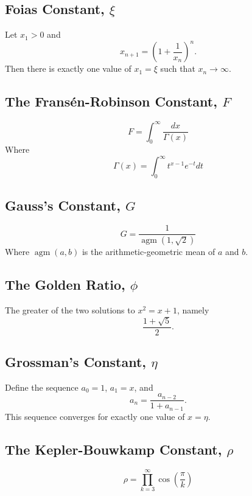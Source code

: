 \documentclass[12pt]{article}
\begin{document}
\subsection{Foias Constant, $\xi$}
Let $x_{1} > 0$ and
\begin{equation*}
x_{n+1} = \left(1 + \frac{1}{x_{n}}\right)^{n}.
\end{equation*}
Then there is exactly one value of $x_{1} = \xi$ such that $x_{n} \rightarrow \infty$.

\subsection{The Frans\'en-Robinson Constant, $F$}
\begin{equation*}
F = \int_{0}^{\infty} \frac{dx}{\Gamma(x)}
\end{equation*}
Where
\begin{equation*}
\Gamma(x) = \int_{0}^{\infty} t^{x - 1}e^{-t} dt 
\end{equation*}

\subsection{Gauss's Constant, $G$}
\begin{equation*}
G = \frac{1}{\operatorname{agm}(1,\sqrt{2})}
\end{equation*}
Where $\operatorname{agm}(a,b)$ is the arithmetic-geometric mean of $a$ and $b$.

\subsection{The Golden Ratio, $\phi$}
The greater of the two solutions to $x^{2} = x + 1$, namely
\begin{equation*}
\frac{1 + \sqrt{5}}{2}.
\end{equation*}

\subsection{Grossman's Constant, $\eta$}
Define the sequence $a_{0} = 1$, $a_{1} = x$, and
\begin{equation*}
a_{n} = \frac{a_{n-2}}{1 + a_{n-1}}.
\end{equation*}
This sequence converges for exactly one value of $x = \eta$.

\subsection{The Kepler-Bouwkamp Constant, $\rho$}
\begin{equation*}
\rho = \prod_{k = 3}^{\infty} \cos\left( \frac{\pi}{k} \right)
\end{equation*}
\end{document}
